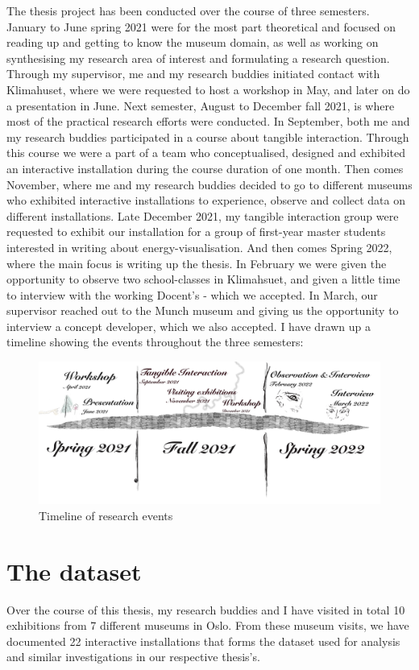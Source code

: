 The thesis project has been conducted over the course of three semesters. January to June spring 2021 were for the most part theoretical and focused on reading up and getting to know the museum domain, as well as working on synthesising my research area of interest and formulating a research question. Through my supervisor, me and my research buddies initiated contact with Klimahuset, where we were requested to host a workshop in May, and later on do a presentation in June. Next semester, August to December fall 2021, is where most of the practical research efforts were conducted. In September, both me and my research buddies participated in a course about tangible interaction. Through this course we were a part of a team who conceptualised, designed and exhibited an interactive installation during the course duration of one month. Then comes November, where me and my research buddies decided to go to different museums who exhibited interactive installations to experience, observe and collect data on different installations. Late December 2021, my tangible interaction group were requested to exhibit our installation for a group of first-year master students interested in writing about energy-visualisation. And then comes Spring 2022, where the main focus is writing up the thesis. In February we were given the opportunity to observe two school-classes in Klimahsuet, and given a little time to interview with the working Docent's - which we accepted. In March, our supervisor reached out to the Munch museum and giving us the opportunity to interview a concept developer, which we also accepted. I have drawn up a timeline showing the events throughout the three semesters:

\begin{figure}[H]
\includegraphics[width=14cm]{pictures/timeline.jpg}
\caption{Timeline of research events}
\centering 
\end{figure}


\section{The dataset}
Over the course of this thesis, my research buddies and I have visited in total 10 exhibitions from 7 different museums in Oslo. From these museum visits, we have documented 22 interactive installations that forms the dataset used for analysis and similar investigations in our respective thesis's. 

